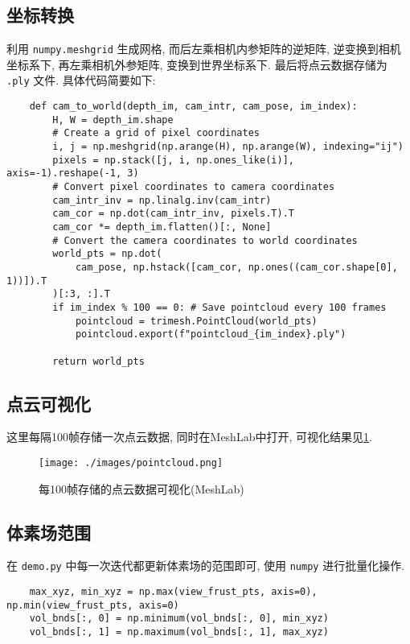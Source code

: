 \documentclass[11pt]{article}
\newcommand\1{\mathds{1}}
\begin{document}
\subsection{坐标转换}
利用 \texttt{numpy.meshgrid} 生成网格, 而后左乘相机内参矩阵的逆矩阵, 逆变换到相机坐标系下, 再左乘相机外参矩阵, 变换到世界坐标系下. 最后将点云数据存储为 \texttt{.ply} 文件. 具体代码简要如下:

\begin{verbatim}
    def cam_to_world(depth_im, cam_intr, cam_pose, im_index):
        H, W = depth_im.shape
        # Create a grid of pixel coordinates
        i, j = np.meshgrid(np.arange(H), np.arange(W), indexing="ij")
        pixels = np.stack([j, i, np.ones_like(i)], axis=-1).reshape(-1, 3)
        # Convert pixel coordinates to camera coordinates
        cam_intr_inv = np.linalg.inv(cam_intr)
        cam_cor = np.dot(cam_intr_inv, pixels.T).T
        cam_cor *= depth_im.flatten()[:, None]
        # Convert the camera coordinates to world coordinates
        world_pts = np.dot(
            cam_pose, np.hstack([cam_cor, np.ones((cam_cor.shape[0], 1))]).T
        )[:3, :].T
        if im_index % 100 == 0: # Save pointcloud every 100 frames
            pointcloud = trimesh.PointCloud(world_pts)
            pointcloud.export(f"pointcloud_{im_index}.ply")
        
        return world_pts
\end{verbatim}
\subsection{点云可视化}
这里每隔100帧存储一次点云数据, 同时在MeshLab中打开, 可视化结果见\cref{fig:pointcloud}.
\begin{figure}[htbp]
    \centering
    \texttt{[image: ./images/pointcloud.png]}
    \caption{每100帧存储的点云数据可视化(MeshLab)}
    \label{fig:pointcloud}
\end{figure}
\subsection{体素场范围}
在 \texttt{demo.py} 中每一次迭代都更新体素场的范围即可, 使用 \texttt{numpy} 进行批量化操作.
\begin{verbatim}
    max_xyz, min_xyz = np.max(view_frust_pts, axis=0), np.min(view_frust_pts, axis=0)
    vol_bnds[:, 0] = np.minimum(vol_bnds[:, 0], min_xyz)
    vol_bnds[:, 1] = np.maximum(vol_bnds[:, 1], max_xyz)
\end{verbatim}
\end{document}
